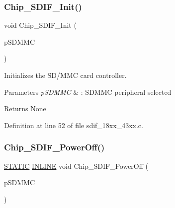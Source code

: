 \subsubsection{\texorpdfstring{Chip\+\_\+\+S\+D\+I\+F\+\_\+\+Init()}{Chip\_SDIF\_Init()}}
{\footnotesize\ttfamily void Chip\+\_\+\+S\+D\+I\+F\+\_\+\+Init (\begin{DoxyParamCaption}\item[{\hyperlink{struct_l_p_c___s_d_m_m_c___t}{L\+P\+C\+\_\+\+S\+D\+M\+M\+C\+\_\+T} $\ast$}]{p\+S\+D\+M\+MC }\end{DoxyParamCaption})}



Initializes the S\+D/\+M\+MC card controller. 


\begin{DoxyParams}{Parameters}
{\em p\+S\+D\+M\+MC} & \+: S\+D\+M\+MC peripheral selected \\
\hline
\end{DoxyParams}
\begin{DoxyReturn}{Returns}
None 
\end{DoxyReturn}


Definition at line 52 of file sdif\+\_\+18xx\+\_\+43xx.\+c.

\mbox{\label{group___s_d_i_f__18_x_x__43_x_x_ga71ab66abadcab4bca2c034dd88bcf4aa}} 
\subsubsection{\texorpdfstring{Chip\+\_\+\+S\+D\+I\+F\+\_\+\+Power\+Off()}{Chip\_SDIF\_PowerOff()}}
{\footnotesize\ttfamily \hyperlink{group___l_p_c___types___public___macros_ga10b2d890d871e1489bb02b7e70d9bdfb}{S\+T\+A\+T\+IC} \hyperlink{spifi__18xx__43xx_8h_a2eb6f9e0395b47b8d5e3eeae4fe0c116}{I\+N\+L\+I\+NE} void Chip\+\_\+\+S\+D\+I\+F\+\_\+\+Power\+Off (\begin{DoxyParamCaption}\item[{\hyperlink{struct_l_p_c___s_d_m_m_c___t}{L\+P\+C\+\_\+\+S\+D\+M\+M\+C\+\_\+T} $\ast$}]{p\+S\+D\+M\+MC }\end{DoxyParamCaption})}



